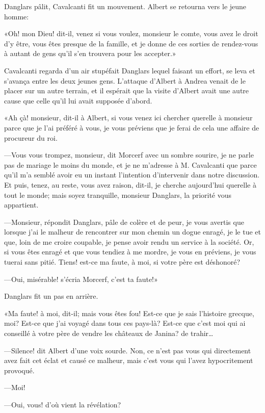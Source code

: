 Danglars pâlit, Cavalcanti fit un mouvement. Albert se retourna vers le jeune homme: 

«Oh! mon Dieu! dit-il, venez si vous voulez, monsieur le comte, vous avez le droit d'y être, vous êtes presque de la famille, et je donne de ces sorties de rendez-vous à autant de gens qu'il s'en trouvera pour les accepter.» 

Cavalcanti regarda d'un air stupéfait Danglars lequel faisant un effort, se leva et s'avança entre les deux jeunes gens. L'attaque d'Albert à Andrea venait de le placer sur un autre terrain, et il espérait que la visite d'Albert avait une autre cause que celle qu'il lui avait supposée d'abord. 

«Ah çà! monsieur, dit-il à Albert, si vous venez ici chercher querelle à monsieur parce que je l'ai préféré à vous, je vous préviens que je ferai de cela une affaire de procureur du roi. 

—Vous vous trompez, monsieur, dit Morcerf avec un sombre sourire, je ne parle pas de mariage le moins du monde, et je ne m'adresse à M. Cavalcanti que parce qu'il m'a semblé avoir eu un instant l'intention d'intervenir dans notre discussion. Et puis, tenez, au reste, vous avez raison, dit-il, je cherche aujourd'hui querelle à tout le monde; mais soyez tranquille, monsieur Danglars, la priorité vous appartient. 

—Monsieur, répondit Danglars, pâle de colère et de peur, je vous avertis que lorsque j'ai le malheur de rencontrer sur mon chemin un dogue enragé, je le tue et que, loin de me croire coupable, je pense avoir rendu un service à la société. Or, si vous êtes enragé et que vous tendiez à me mordre, je vous en préviens, je vous tuerai sans pitié. Tiens! est-ce ma faute, à moi, si votre père est déshonoré? 

—Oui, misérable! s'écria Morcerf, c'est ta faute!» 

Danglars fit un pas en arrière. 

«Ma faute! à moi, dit-il; mais vous êtes fou! Est-ce que je sais l'histoire grecque, moi? Est-ce que j'ai voyagé dans tous ces pays-là? Est-ce que c'est moi qui ai conseillé à votre père de vendre les châteaux de Janina? de trahir\dots 

—Silence! dit Albert d'une voix sourde. Non, ce n'est pas vous qui directement avez fait cet éclat et causé ce malheur, mais c'est vous qui l'avez hypocritement provoqué. 

—Moi! 

—Oui, vous! d'où vient la révélation? 

